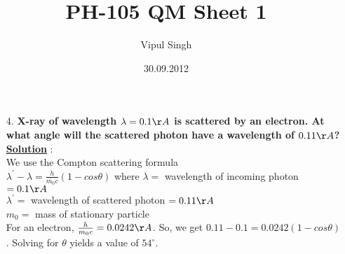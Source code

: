 \documentclass[10pt, a4paper]{article}
\begin{document}
\title{PH-105 QM Sheet 1}
\date{30.09.2012}
\author{Vipul Singh}
\maketitle
\begin{enumerate}
\item[4.]{\bf X-ray of wavelength $\lambda=0.1\AA$ is scattered by an electron. At what angle will the scattered photon have a wavelength of $0.11\AA$?}\\

{\underline {\bf Solution}} : \\

We use the Compton scattering formula \\
$\lambda^{'}-\lambda=\frac{h}{m_{0}c}(1-cos\theta)$
where $\lambda=$ wavelength of incoming photon $=0.1\AA$\\
$\lambda^{'}=$ wavelength of scattered photon $=0.11\AA$\\
$m_{0}=$ mass of stationary particle\\
For an electron, $\frac{h}{m_{0}c}=0.0242\AA$. So, we get $0.11-0.1=0.0242(1-cos\theta)$. Solving for $\theta$ yields a value of $54^{\circ}$.
\end{enumerate}
\end{document}
